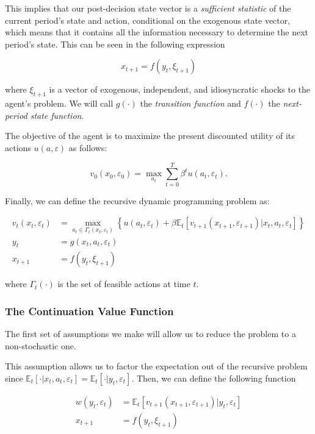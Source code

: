 \documentclass{article}
\begin{document}
This implies that our post-decision state vector is a \textit{sufficient statistic} of the current period's state and action, conditional on the exogenous state vector, which means that it contains all the information necessary to determine the next period's state. This can be seen in the following expression

\begin{equation}
x_{t+1} = f(y_t, \xi_{t+1})
\end{equation}

where $\xi_{t+1}$ is a vector of exogenous, independent, and idiosyncratic shocks to the agent's problem. We will call $g(\cdot)$ the \textit{transition function} and $f(\cdot)$ the \textit{next-period state function}.

The objective of the agent is to maximize the present discounted utility of its actions $u(a, \varepsilon)$ as follows:

\begin{equation}
v_0(x_0, \varepsilon_0) = \max_{a_t} \sum_{t=0}^T \beta^t u(a_t, \varepsilon_t).
\end{equation}

Finally, we can define the recursive dynamic programming problem as:

\begin{align}
v_t(x_t, \varepsilon_t) & = \max_{a_t \in \Gamma_t(x_t, \varepsilon_t)} \left\{ u(a_t, \varepsilon_t) + \beta \mathbb{E}_t \left[ v_{t+1}(x_{t+1}, \varepsilon_{t+1}) \lvert  x_t, a_t, \varepsilon_t \right] \right\} \\
    y_t & = g(x_t,  a_t, \varepsilon_t) \\
    x_{t+1} & = f(y_t, \xi_{t+1})
\end{align}

where $\Gamma_t(\cdot)$ is the set of feasible actions at time $t$.

\subsubsection{The Continuation Value Function}

The first set of assumptions we make will allow us to reduce the problem to a non-stochastic one.

This assumption allows us to factor the expectation out of the recursive problem since $\mathbb{E}_t[\cdot \lvert x_t, a_t, \varepsilon_t] = \mathbb{E}_t[\cdot \lvert y_t, \varepsilon_t]$. Then, we can define the following function

\begin{align}
w(y_t, \varepsilon_t) & = \mathbb{E}_t \left[ v_{t+1}(x_{t+1}, \varepsilon_{t+1}) \lvert y_t, \varepsilon_t \right] \\
x_{t+1} & = f(y_t, \xi_{t+1})
\end{align}
\end{document}
